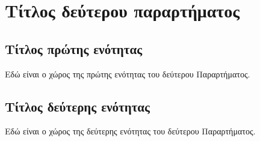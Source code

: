 \chapter{Τίτλος δεύτερου παραρτήματος}
\label{app:SecondAppendix}

\section{Τίτλος πρώτης ενότητας}
\label{sec:FirstSection}
Εδώ είναι ο χώρος της πρώτης ενότητας του δεύτερου Παραρτήματος.

\section{Τίτλος δεύτερης ενότητας}
\label{sec:SecondSection}
Εδώ είναι ο χώρος της δεύτερης ενότητας του δεύτερου Παραρτήματος.